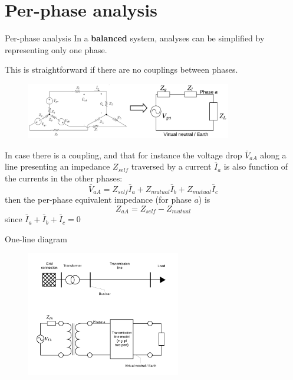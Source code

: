 \section{Per-phase analysis}
\begin{frame}[allowframebreaks]{Per-phase analysis}
    In a \textbf{balanced} system, analyses can be simplified by representing only one phase.
    
    This is straightforward if there are no couplings between phases.
    \begin{figure}
        \centering
        \includegraphics[width=0.8\textwidth]{images/per-phase.png}
    \end{figure}
    In case there is a coupling, and that for instance the voltage drop $\bar{V}_{aA}$ along a line presenting an impedance $Z_{self}$ traversed by a current $\bar{I}_{a}$ is also function of the currents in the other phases:
$$\bar{V}_{aA} = Z_{self} \bar{I}_{a} + Z_{mutual} \bar{I}_{b} + Z_{mutual} \bar{I}_{c}$$
then the per-phase equivalent impedance (for phase $a$) is $$Z_{aA} = Z_{self} - Z_{mutual}$$
since $\bar{I}_{a} + \bar{I}_{b} + \bar{I}_{c} = 0$
\end{frame}

\begin{frame}{One-line diagram}
\begin{figure}
        \centering
        \includegraphics[width=0.6\textwidth]{images/one-line.png}
    \end{figure}
\end{frame}

